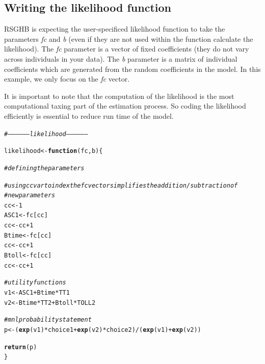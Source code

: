 \documentclass{article}\usepackage[]{graphicx}\usepackage[]{color}
\makeatletter
\newcommand{\hlnum}[1]{\textcolor[rgb]{0.686,0.059,0.569}{#1}}%
\newcommand{\hlcom}[1]{\textcolor[rgb]{0.678,0.584,0.686}{\textit{#1}}}%
\newcommand{\hlopt}[1]{\textcolor[rgb]{0,0,0}{#1}}%
\newcommand{\hlstd}[1]{\textcolor[rgb]{0.345,0.345,0.345}{#1}}%
\newcommand{\hlkwa}[1]{\textcolor[rgb]{0.161,0.373,0.58}{\textbf{#1}}}%
\newcommand{\hlkwb}[1]{\textcolor[rgb]{0.69,0.353,0.396}{#1}}%
\newcommand{\hlkwc}[1]{\textcolor[rgb]{0.333,0.667,0.333}{#1}}%
\newcommand{\hlkwd}[1]{\textcolor[rgb]{0.737,0.353,0.396}{\textbf{#1}}}%
\newenvironment{kframe}{%
 \def\at@end@of@kframe{}%
 \ifinner\ifhmode%
  \def\at@end@of@kframe{\end{minipage}}%
  \begin{minipage}{\columnwidth}%
 \fi\fi%
 \def\FrameCommand##1{\hskip\@totalleftmargin \hskip-\fboxsep
 \colorbox{shadecolor}{##1}\hskip-\fboxsep
     \hskip-\linewidth \hskip-\@totalleftmargin \hskip\columnwidth}%
 \MakeFramed {\advance\hsize-\width
   \@totalleftmargin\z@ \linewidth\hsize
   \@setminipage}}%
 {\par\unskip\endMakeFramed%
 \at@end@of@kframe}
\newenvironment{knitrout}{}{} %
\makeatother
\begin{document}
\subsection*{Writing the likelihood function}

RSGHB is expecting the user-specificed likelihood function to take the parameters \emph{fc} and \emph{b} (even if they are not used within the function calculate the likelihood). The \emph{fc} parameter is a vector of fixed coefficients (they do not vary across individuals in your data). The \emph{b} parameter is a matrix of individual coefficients which are generated from the random coefficients in the model. In this example, we only focus on the \emph{fc} vector.

It is important to note that the computation of the likelihood is the most computational taxing part of the estimation process. So coding the likelihood efficiently is essential to reduce run time of the model.


\begin{knitrout}
\color{fgcolor}\begin{kframe}
\begin{alltt}
\hlcom{# ------------------ likelihood ------------------}

\hlstd{likelihood} \hlkwb{<-} \hlkwa{function}\hlstd{(}\hlkwc{fc}\hlstd{,} \hlkwc{b}\hlstd{) \{}

    \hlcom{# defining the parameters}

    \hlcom{# using cc var to index the fc vector simplifies the addition/subtraction of}
    \hlcom{# new parameters}
    \hlstd{cc} \hlkwb{<-} \hlnum{1}
    \hlstd{ASC1} \hlkwb{<-} \hlstd{fc[cc]}
    \hlstd{cc} \hlkwb{<-} \hlstd{cc} \hlopt{+} \hlnum{1}
    \hlstd{Btime} \hlkwb{<-} \hlstd{fc[cc]}
    \hlstd{cc} \hlkwb{<-} \hlstd{cc} \hlopt{+} \hlnum{1}
    \hlstd{Btoll} \hlkwb{<-} \hlstd{fc[cc]}
    \hlstd{cc} \hlkwb{<-} \hlstd{cc} \hlopt{+} \hlnum{1}

    \hlcom{# utility functions}
    \hlstd{v1} \hlkwb{<-} \hlstd{ASC1} \hlopt{+} \hlstd{Btime} \hlopt{*} \hlstd{TT1}
    \hlstd{v2} \hlkwb{<-} \hlstd{Btime} \hlopt{*} \hlstd{TT2} \hlopt{+} \hlstd{Btoll} \hlopt{*} \hlstd{TOLL2}

    \hlcom{# mnl probability statement}
    \hlstd{p} \hlkwb{<-} \hlstd{(}\hlkwd{exp}\hlstd{(v1)} \hlopt{*} \hlstd{choice1} \hlopt{+} \hlkwd{exp}\hlstd{(v2)} \hlopt{*} \hlstd{choice2)}\hlopt{/}\hlstd{(}\hlkwd{exp}\hlstd{(v1)} \hlopt{+} \hlkwd{exp}\hlstd{(v2))}

    \hlkwd{return}\hlstd{(p)}
\hlstd{\}}
\end{alltt}
\end{kframe}
\end{knitrout}
\end{document}
